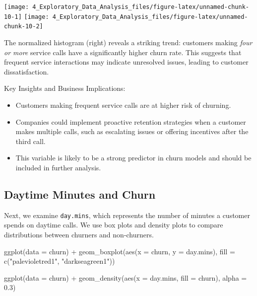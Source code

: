 \documentclass[
  11pt,
]{book}
\makeatletter
\newenvironment{Shaded}{}{}
\newcommand{\AttributeTok}[1]{#1}
\newcommand{\FloatTok}[1]{#1}
\newcommand{\FunctionTok}[1]{#1}
\newcommand{\NormalTok}[1]{#1}
\newcommand{\SpecialCharTok}[1]{\textcolor[rgb]{0.39,0.39,0.39}{#1}}
\newcommand{\StringTok}[1]{\textcolor[rgb]{0.39,0.39,0.39}{#1}}
\providecommand{\tightlist}{%
  \setlength{\itemsep}{0pt}\setlength{\parskip}{0pt}}
\newenvironment{kframe}{%
\medskip{}
\setlength{\fboxsep}{.8em}
 \def\at@end@of@kframe{}%
 \ifinner\ifhmode%
  \def\at@end@of@kframe{\end{minipage}}%
  \begin{minipage}{\columnwidth}%
 \fi\fi%
 \def\FrameCommand##1{\hskip\@totalleftmargin \hskip-\fboxsep
 \colorbox{shadecolor}{##1}\hskip-\fboxsep
     \hskip-\linewidth \hskip-\@totalleftmargin \hskip\columnwidth}%
 \MakeFramed {\advance\hsize-\width
   \@totalleftmargin\z@ \linewidth\hsize
   \@setminipage}}%
 {\par\unskip\endMakeFramed%
 \at@end@of@kframe}
\renewenvironment{Shaded}{\begin{kframe}}{\end{kframe}}
\theoremstyle{definition}
\theoremstyle{definition}
\theoremstyle{definition}
\theoremstyle{definition}
\theoremstyle{remark}
\makeatother
\begin{document}
\texttt{[image: 4\_Exploratory\_Data\_Analysis\_files/figure-latex/unnamed-chunk-10-1]} \texttt{[image: 4\_Exploratory\_Data\_Analysis\_files/figure-latex/unnamed-chunk-10-2]}

The normalized histogram (right) reveals a striking trend: customers making \emph{four or more} service calls have a significantly higher churn rate. This suggests that frequent service interactions may indicate unresolved issues, leading to customer dissatisfaction.

Key Insights and Business Implications:

\begin{itemize}
\tightlist
\item
  Customers making frequent service calls are at higher risk of churning.\\
\item
  Companies could implement proactive retention strategies when a customer makes multiple calls, such as escalating issues or offering incentives after the third call.\\
\item
  This variable is likely to be a strong predictor in churn models and should be included in further analysis.
\end{itemize}

\subsection*{Daytime Minutes and Churn}\label{daytime-minutes-and-churn}


Next, we examine \texttt{day.mins}, which represents the number of minutes a customer spends on daytime calls. We use box plots and density plots to compare distributions between churners and non-churners.

\begin{Shaded}
\begin{Highlighting}[]
\FunctionTok{ggplot}\NormalTok{(}\AttributeTok{data =}\NormalTok{ churn) }\SpecialCharTok{+}
    \FunctionTok{geom\_boxplot}\NormalTok{(}\FunctionTok{aes}\NormalTok{(}\AttributeTok{x =}\NormalTok{ churn, }\AttributeTok{y =}\NormalTok{ day.mins), }
                 \AttributeTok{fill =} \FunctionTok{c}\NormalTok{(}\StringTok{"palevioletred1"}\NormalTok{, }\StringTok{"darkseagreen1"}\NormalTok{))}

\FunctionTok{ggplot}\NormalTok{(}\AttributeTok{data =}\NormalTok{ churn) }\SpecialCharTok{+}
    \FunctionTok{geom\_density}\NormalTok{(}\FunctionTok{aes}\NormalTok{(}\AttributeTok{x =}\NormalTok{ day.mins, }\AttributeTok{fill =}\NormalTok{ churn), }\AttributeTok{alpha =} \FloatTok{0.3}\NormalTok{)}
\end{Highlighting}
\end{Shaded}
\end{document}
